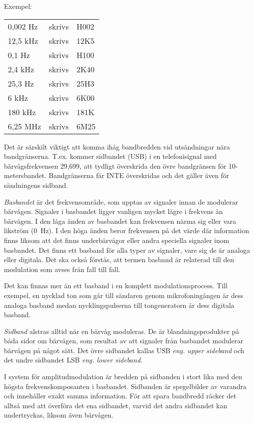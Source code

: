 Exempel:\\
\begin{tabular}{lll}
	0,002 Hz & skrivs & H002\\
	12,5 kHz & skrivs & 12K5\\
	0,1 Hz & skrivs & H100\\
	2,4 kHz & skrivs & 2K40\\
	25,3 Hz & skrivs & 25H3\\
	6 kHz & skrivs & 6K00\\
	180 kHz & skrivs & 181K\\
	6,25 MHz & skrivs & 6M25\\
\end{tabular}

Det är särskilt viktigt att komma ihåg bandbredden vid utsändningar nära
bandgränserna. T.ex. kommer sidbandet (USB) i en telefonisignal med
bärvågsfrekvensen 29,699, att tydligt överskrida den övre bandgränsen för
10-metersbandet. Bandgränserna får INTE överskridas och det gäller även för
sändningens sidband.

\emph{Basbandet} är det frekvensområde, som upptas av signaler innan de
modulerar bärvågen. Signaler i basbandet ligger vanligen mycket lägre i
frekvens än bärvågen. I den låga änden av basbandet kan frekvensen närma sig
eller vara likström (0~Hz). I den höga änden beror frekvensen på det värde där
information finns liksom att det finns underbärvågor eller andra speciella
signaler inom basbandet. Det finns ett basband för alla typer av signaler, vare
sig de är analoga eller digitala. Det ska också förstås, att termen basband är
relaterad till den modulation som avses från fall till fall.

Det kan finnas mer än ett basband i en komplett modulationsprocess. Till
exempel, en nycklad ton som går till sändaren genom mikrofoningången är dess
analoga basband medan nycklingspulserna till tongeneratorn är dess digitala
basband.

\emph{Sidband} alstras alltid när en bärvåg moduleras. De är blandningsprodukter
på båda sidor om bärvågen, som resultat av att signaler från basbandet modulerar
bärvågen på något sätt. Det övre sidbandet kallas USB \emph{eng. upper sideband}
och det undre sidbandet LSB \emph{eng. lower sideband}.

I system för amplitudmodulation är bredden på sidbanden i stort lika med den
högsta frekvenskomposanten i basbandet. Sidbanden är spegelbilder av varandra
och innehåller exakt samma information. För att spara bandbredd räcker det
alltså med att överföra det ena sidbandet, varvid det andra sidbandet kan
undertryckas, liksom även bärvågen.

